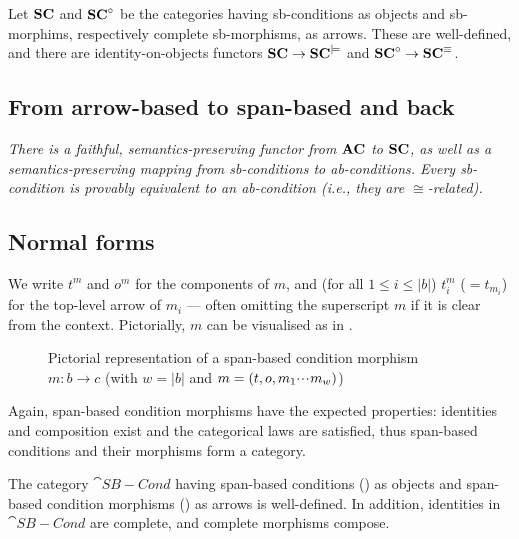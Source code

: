 \begin{theorem} 
Let $\mathbf{SC}$ and $\mathbf{SC}^\circ$ be the categories having sb-conditions as objects and sb-morphims, respectively complete sb-morphisms, as arrows. These are well-defined, and there are identity-on-objects functors $\mathbf{SC} \to \mathbf{SC}^{\models}$ and $\mathbf{SC}^\circ \to \mathbf{SC}^{\equiv}$.
\end{theorem}

\subsection{From arrow-based to span-based and back}

\emph{There is a faithful, semantics-preserving functor from $\mathbf{AC}$ to $\mathbf{SC}$, as well as a semantics-preserving mapping from sb-conditions to ab-conditions. Every sb-condition is provably equivalent to an ab-condition (i.e., they are $\cong$-related).}

\subsection{Normal forms}


%
\begin{center}

\end{center}
%
We write $t^m$ and $o^m$ for the components of $m$, and (for all $1\leq i\leq |b|$) $t^m_i$ ($=t_{m_i}$) for the top-level arrow of $m_i$ --- often omitting the superscript $m$ if it is clear from the context. Pictorially, $m$ can be visualised as in .
%
\begin{figure}
  \centering
  
  \caption{Pictorial representation of a span-based condition morphism $m:b\to c$ (with $w=|b|$ and $m=(t,o,m_1{\cdotp\mkern-2mu\cdotp\mkern-2mu\cdotp\mkern1mu} m_w)$)}
\end{figure}

\medskip\noindent Again, span-based condition morphisms have the expected properties: identities and composition exist and the categorical laws are satisfied, thus span-based conditions and their morphisms form a category.

\begin{proposition}
  The category $\cat{SB-Cond}$ having span-based conditions () as objects and span-based condition morphisms () as arrows is well-defined. In addition, identities in $\cat{SB-Cond}$ are complete, and complete morphisms compose.
\end{proposition}
 
